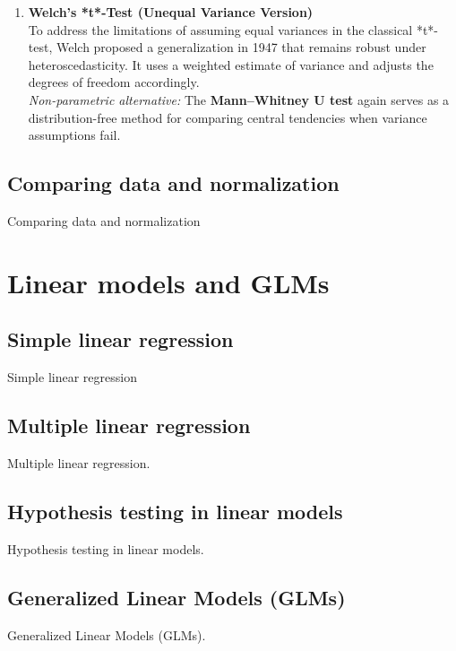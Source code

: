 \documentclass{book}
\begin{document}
\begin{enumerate}
\item \textbf{Welch’s *t*-Test (Unequal Variance Version)}\\
To address the limitations of assuming equal variances in the classical *t*-test, Welch proposed a generalization in 1947 \cite{welch1947} that remains robust under heteroscedasticity. It uses a weighted estimate of variance and adjusts the degrees of freedom accordingly.\\
\textit{Non-parametric alternative:} The \textbf{Mann–Whitney U test} again serves as a distribution-free method for comparing central tendencies when variance assumptions fail.

\end{enumerate}

\newpage

\section{Comparing data and normalization}
Comparing data and normalization



\chapter{Linear models and GLMs}

\section{Simple linear regression}
Simple linear regression

\newpage

\section{Multiple linear regression}
Multiple linear regression.

\newpage

\section{Hypothesis testing in linear models}
Hypothesis testing in linear models.

\newpage

\section{Generalized Linear Models (GLMs)}
Generalized Linear Models (GLMs).
\end{document}
